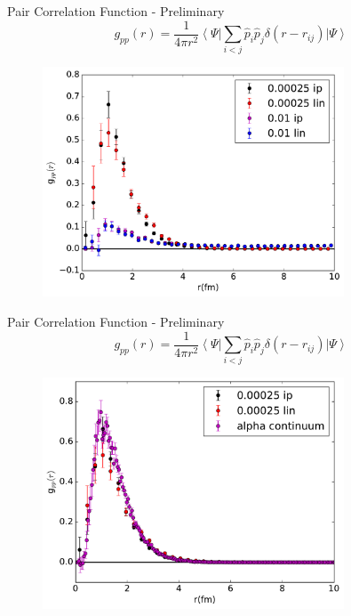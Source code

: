 \documentclass{beamer}
\newcommand{\ket}[1]{\left| #1 \right>}
\newcommand{\bra}[1]{\left< #1 \right|}
\begin{document}
\begin{frame}{Pair Correlation Function - Preliminary}
\vspace{-0.1cm}
\begin{equation*}
   g_{pp}(r) = \frac{1}{4\pi r^2} \bra{\Psi}\sum\limits_{i<j}\hat{p}_i\hat{p}_j\delta(r-r_{ij})\ket{\Psi}
\end{equation*}
\vspace{-0.4cm}
\begin{figure}[h]
   \centering
   \includegraphics[width=0.80\textwidth]{figures/gpp.pdf}
\end{figure}
\end{frame}

\begin{frame}{Pair Correlation Function - Preliminary}
\vspace{-0.1cm}
\begin{equation*}
   g_{pp}(r) = \frac{1}{4\pi r^2} \bra{\Psi}\sum\limits_{i<j}\hat{p}_i\hat{p}_j\delta(r-r_{ij})\ket{\Psi}
\end{equation*}
\vspace{-0.4cm}
\begin{figure}[h]
   \centering
   \includegraphics[width=0.80\textwidth]{figures/gpp_continuum.pdf}
\end{figure}
\end{frame}
\end{document}
